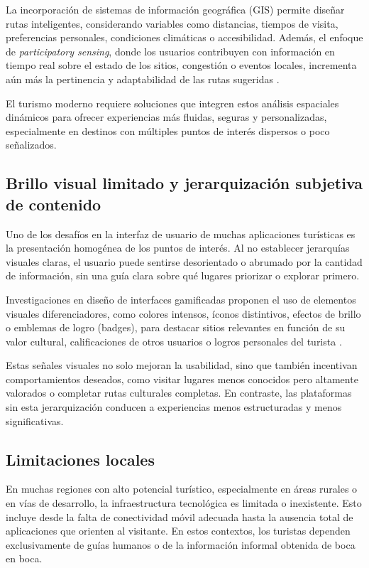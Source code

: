 \documentclass[12pt]{article}
\begin{document}
La incorporación de sistemas de información geográfica (GIS) permite diseñar rutas inteligentes, considerando variables como distancias, tiempos de visita, preferencias personales, condiciones climáticas o accesibilidad. Además, el enfoque de \textit{participatory sensing}, donde los usuarios contribuyen con información en tiempo real sobre el estado de los sitios, congestión o eventos locales, incrementa aún más la pertinencia y adaptabilidad de las rutas sugeridas \cite{Arxiv2025,Tandfonline2025}.

El turismo moderno requiere soluciones que integren estos análisis espaciales dinámicos para ofrecer experiencias más fluidas, seguras y personalizadas, especialmente en destinos con múltiples puntos de interés dispersos o poco señalizados.

\subsection{Brillo visual limitado y jerarquización subjetiva de contenido}
Uno de los desafíos en la interfaz de usuario de muchas aplicaciones turísticas es la presentación homogénea de los puntos de interés. Al no establecer jerarquías visuales claras, el usuario puede sentirse desorientado o abrumado por la cantidad de información, sin una guía clara sobre qué lugares priorizar o explorar primero.

Investigaciones en diseño de interfaces gamificadas proponen el uso de elementos visuales diferenciadores, como colores intensos, íconos distintivos, efectos de brillo o emblemas de logro (badges), para destacar sitios relevantes en función de su valor cultural, calificaciones de otros usuarios o logros personales del turista \cite{Swacha2017,TravelPlot2018}. 

Estas señales visuales no solo mejoran la usabilidad, sino que también incentivan comportamientos deseados, como visitar lugares menos conocidos pero altamente valorados o completar rutas culturales completas. En contraste, las plataformas sin esta jerarquización conducen a experiencias menos estructuradas y menos significativas.

\subsection{Limitaciones locales}
En muchas regiones con alto potencial turístico, especialmente en áreas rurales o en vías de desarrollo, la infraestructura tecnológica es limitada o inexistente. Esto incluye desde la falta de conectividad móvil adecuada hasta la ausencia total de aplicaciones que orienten al visitante. En estos contextos, los turistas dependen exclusivamente de guías humanos o de la información informal obtenida de boca en boca.
\end{document}
